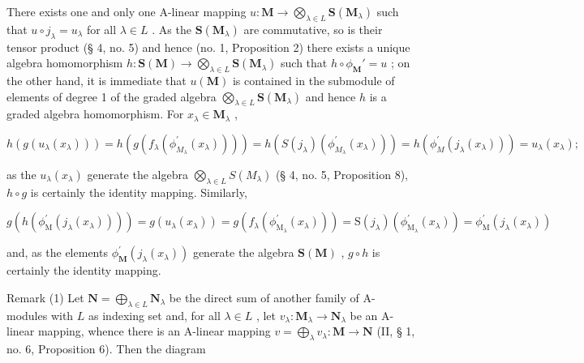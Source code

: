 There exists one and only one A-linear mapping \(u: \mathbf{M} \to \bigotimes_{\lambda \in L} \mathbf{S}(\mathbf{M}_{\lambda})\) such that \(u \circ j_{\lambda} = u_{\lambda}\) for all \(\lambda \in L\) . As the \(\mathbf{S}(\mathbf{M}_{\lambda})\) are commutative, so is their tensor product (§ 4, no. 5) and hence (no. 1, Proposition 2) there exists a unique algebra homomorphism \(h: \mathbf{S}(\mathbf{M}) \to \bigotimes_{\lambda \in L} \mathbf{S}(\mathbf{M}_{\lambda})\) such that \(h \circ \phi_{\mathbf{M}}' = u\) ; on the other hand, it is immediate that \(u(\mathbf{M})\) is contained in the submodule of elements of degree 1 of the graded algebra \(\bigotimes_{\lambda \in L} \mathbf{S}(\mathbf{M}_{\lambda})\) and hence \(h\) is a graded algebra homomorphism. For \(x_{\lambda} \in \mathbf{M}_{\lambda}\) ,

\[
h \left(g \left(u _ {\lambda} \left(x _ {\lambda}\right)\right)\right) = h \left(g \left(f _ {\lambda} \left(\phi_ {M _ {\lambda}} ^ {\prime} \left(x _ {\lambda}\right)\right)\right)\right) = h \left(S \left(j _ {\lambda}\right) \left(\phi_ {M _ {\lambda}} ^ {\prime} \left(x _ {\lambda}\right)\right)\right) = h \left(\phi_ {M} ^ {\prime} \left(j _ {\lambda} \left(x _ {\lambda}\right)\right)\right) = u _ {\lambda} \left(x _ {\lambda}\right);
\]

as the \(u_{\lambda}(x_{\lambda})\) generate the algebra \(\bigotimes_{\lambda \in L} S(M_{\lambda})\) (§ 4, no. 5, Proposition 8), \(h \circ g\) is certainly the identity mapping. Similarly,

\[
g \left(h \left(\phi_ {\mathrm{M}} ^ {\prime} \left(j _ {\lambda} \left(x _ {\lambda}\right)\right)\right)\right) = g \left(u _ {\lambda} \left(x _ {\lambda}\right)\right) = g \left(f _ {\lambda} \left(\phi_ {\mathrm{M} _ {\lambda}} ^ {\prime} \left(x _ {\lambda}\right)\right)\right) = \mathrm{S} \left(j _ {\lambda}\right) \left(\phi_ {\mathrm{M} _ {\lambda}} ^ {\prime} \left(x _ {\lambda}\right)\right) = \phi_ {\mathrm{M}} ^ {\prime} \left(j _ {\lambda} \left(x _ {\lambda}\right)\right)
\]

and, as the elements \(\phi_{\mathbf{M}}^{\prime}(j_{\lambda}(x_{\lambda}))\) generate the algebra \(\mathbf{S}(\mathbf{M})\) , \(g \circ h\) is certainly the identity mapping.

Remark (1) Let \(\mathbf{N} = \bigoplus_{\lambda \in L} \mathbf{N}_{\lambda}\) be the direct sum of another family of A-modules with \(L\) as indexing set and, for all \(\lambda \in L\) , let \(v_{\lambda}: \mathbf{M}_{\lambda} \to \mathbf{N}_{\lambda}\) be an A-linear mapping, whence there is an A-linear mapping \(v = \bigoplus_{\lambda} v_{\lambda}: \mathbf{M} \to \mathbf{N}\) (II, § 1, no. 6, Proposition 6). Then the diagram

